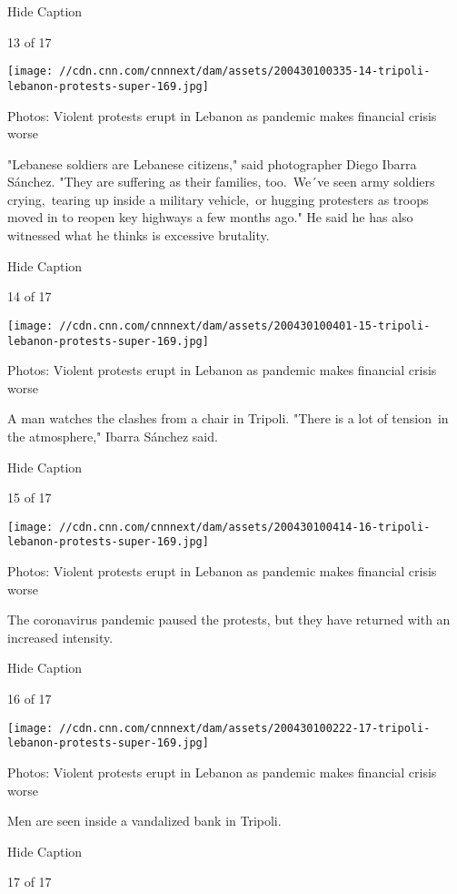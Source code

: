 Hide Caption

13 of 17

\texttt{[image: //cdn.cnn.com/cnnnext/dam/assets/200430100335-14-tripoli-lebanon-protests-super-169.jpg]}

Photos: Violent protests erupt in Lebanon as pandemic makes financial
crisis worse

"Lebanese soldiers are Lebanese citizens," said photographer Diego
Ibarra Sánchez. "They are suffering as their families, too.~We´ve seen
army soldiers crying,~tearing up inside a military vehicle,~or hugging
protesters as troops moved in to reopen key highways a few months ago."
He said he has also witnessed what he thinks is excessive brutality.

Hide Caption

14 of 17

\texttt{[image: //cdn.cnn.com/cnnnext/dam/assets/200430100401-15-tripoli-lebanon-protests-super-169.jpg]}

Photos: Violent protests erupt in Lebanon as pandemic makes financial
crisis worse

A man watches the clashes from a chair in Tripoli. "There is a lot of
tension~in the atmosphere," Ibarra Sánchez said.

Hide Caption

15 of 17

\texttt{[image: //cdn.cnn.com/cnnnext/dam/assets/200430100414-16-tripoli-lebanon-protests-super-169.jpg]}

Photos: Violent protests erupt in Lebanon as pandemic makes financial
crisis worse

The coronavirus pandemic paused the protests, but they have returned
with an increased intensity.

Hide Caption

16 of 17

\texttt{[image: //cdn.cnn.com/cnnnext/dam/assets/200430100222-17-tripoli-lebanon-protests-super-169.jpg]}

Photos: Violent protests erupt in Lebanon as pandemic makes financial
crisis worse

Men are seen inside a vandalized bank in Tripoli.

Hide Caption

17 of 17

